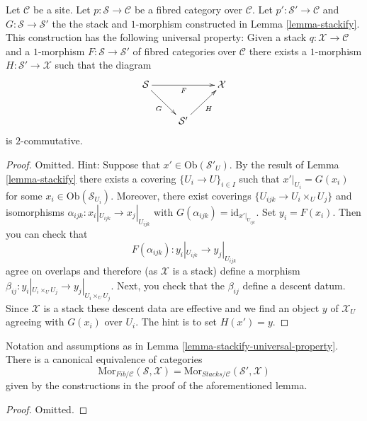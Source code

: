 \begin{lemma}
\label{lemma-stackify-universal-property}
Let $\mathcal{C}$ be a site.
Let $p : \mathcal{S} \to \mathcal{C}$ be a fibred category over $\mathcal{C}$.
Let $p' : \mathcal{S}' \to \mathcal{C}$ and $G : \mathcal{S} \to \mathcal{S}'$
the the stack and $1$-morphism constructed in Lemma \ref{lemma-stackify}.
This construction has the following universal property: Given a stack
$q : \mathcal{X} \to \mathcal{C}$ and a $1$-morphism
$F : \mathcal{S} \to \mathcal{S}'$ of fibred categories over $\mathcal{C}$
there exists a $1$-morphism $H : \mathcal{S}' \to \mathcal{X}$
such that the diagram
$$
\xymatrix{
\mathcal{S} \ar[rr]_F \ar[rd]_G & & \mathcal{X} \\
& \mathcal{S}' \ar[ru]_H
}
$$
is $2$-commutative.
\end{lemma}

\begin{proof}
Omitted. Hint: Suppose that $x' \in \text{Ob}(\mathcal{S}'_U)$.
By the result of Lemma \ref{lemma-stackify}
there exists a covering $\{U_i \to U\}_{i \in I}$
such that $x'|_{U_i} = G(x_i)$ for some $x_i \in \text{Ob}(\mathcal{S}_{U_i})$.
Moreover, there exist coverings $\{U_{ijk} \to U_i \times_U U_j\}$
and isomorphisms $\alpha_{ijk} : x_i|_{U_{ijk}} \to x_j|_{U_{ijk}}$
with $G(\alpha_{ijk}) = \text{id}_{x'|_{U_{ijk}}}$. Set $y_i = F(x_i)$.
Then you can check that
$$
F(\alpha_{ijk}) : y_i|_{U_{ijk}} \to y_j|_{U_{ijk}}
$$
agree on overlaps and therefore (as $\mathcal{X}$ is a stack) define
a morphism $\beta_{ij} : y_i|_{U_i \times_U U_j} \to y_j|_{U_i \times_U U_j}$.
Next, you check that the $\beta_{ij}$ define a descent datum. Since
$\mathcal{X}$ is a stack these descent data are effective and we find
an object $y$ of $\mathcal{X}_U$ agreeing with $G(x_i)$ over $U_i$.
The hint is to set $H(x') = y$.
\end{proof}

\begin{lemma}
\label{lemma-stackify-universal-property-more}
Notation and assumptions as in
Lemma \ref{lemma-stackify-universal-property}.
There is a canonical equivalence of categories
$$
\text{Mor}_{\textit{Fib}/\mathcal{C}}(\mathcal{S}, \mathcal{X})
=
\text{Mor}_{\textit{Stacks}/\mathcal{C}}(\mathcal{S}', \mathcal{X})
$$
given by the constructions in the proof of the aforementioned lemma.
\end{lemma}

\begin{proof}
Omitted.
\end{proof}

